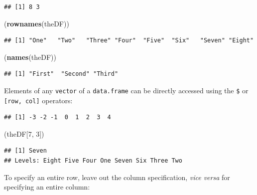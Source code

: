 \documentclass[]{book}
\newenvironment{Shaded}{\begin{snugshade}}{\end{snugshade}}
\newcommand{\DecValTok}[1]{\textcolor[rgb]{0.00,0.00,0.81}{#1}}
\newcommand{\KeywordTok}[1]{\textcolor[rgb]{0.13,0.29,0.53}{\textbf{#1}}}
\newcommand{\NormalTok}[1]{#1}
\newcommand{\OperatorTok}[1]{\textcolor[rgb]{0.81,0.36,0.00}{\textbf{#1}}}
\theoremstyle{definition}
\theoremstyle{definition}
\theoremstyle{definition}
\theoremstyle{remark}
\begin{document}
\begin{verbatim}
## [1] 8 3
\end{verbatim}

\begin{Shaded}
\begin{Highlighting}[]
\NormalTok{(}\KeywordTok{rownames}\NormalTok{(theDF))}
\end{Highlighting}
\end{Shaded}

\begin{verbatim}
## [1] "One"   "Two"   "Three" "Four"  "Five"  "Six"   "Seven" "Eight"
\end{verbatim}

\begin{Shaded}
\begin{Highlighting}[]
\NormalTok{(}\KeywordTok{names}\NormalTok{(theDF))}
\end{Highlighting}
\end{Shaded}

\begin{verbatim}
## [1] "First"  "Second" "Third"
\end{verbatim}

Elements of any \texttt{vector} of a \texttt{data.frame} can be directly
accessed using the \texttt{\$} or \texttt{{[}row,\ col{]}} operators:

\begin{Shaded}
\end{Shaded}

\begin{verbatim}
## [1] -3 -2 -1  0  1  2  3  4
\end{verbatim}

\begin{Shaded}
\begin{Highlighting}[]
\NormalTok{(theDF[}\DecValTok{7}\NormalTok{, }\DecValTok{3}\NormalTok{])}
\end{Highlighting}
\end{Shaded}

\begin{verbatim}
## [1] Seven
## Levels: Eight Five Four One Seven Six Three Two
\end{verbatim}

To specify an entire row, leave out the column specification, \emph{vice
versa} for specifying an entire column:
\end{document}
